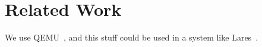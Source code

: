 \section{Related Work}
\label{sec:relwork}

We use QEMU~\cite{Bellard:2005}, and this stuff could be used in a system like Lares~\cite{payne:2008}.
